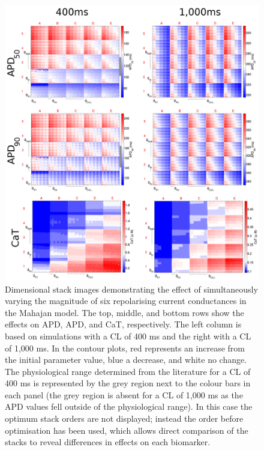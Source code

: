 \documentclass[../thesis-main.tex]{subfiles}
\begin{document}
\begin{figure}
 \centering
 \includegraphics[width=\textwidth]{mahajan-paramEffect}
 \caption[Effect of parameter variation on Mahajan population.]{Dimensional stack images demonstrating the effect of simultaneously varying the magnitude of six repolarising current conductances in the Mahajan model. The top, middle, and bottom rows show the effects on APD, APD, and CaT, respectively. The left column is based on simulations with a CL of 400 ms and the right with a CL of 1,000 ms. In the contour plots, red represents an increase from the initial parameter value, blue a decrease, and white no change. The physiological range determined from the literature for a CL of 400 ms is represented by the grey region next to the colour bars in each panel (the grey region is absent for a CL of 1,000 ms as the APD values fell outside of the physiological range). In this case the optimum stack orders are not displayed; instead the order before optimisation has been used, which allows direct comparison of the stacks to reveal differences in effects on each biomarker.}
 \label{fig:mahajan-paramEffect}
\end{figure}
\end{document}
